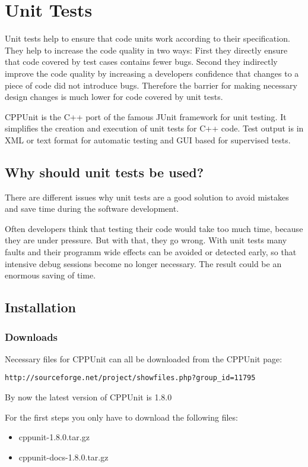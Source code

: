 \chapter{Unit Tests}

Unit tests help to ensure that code units work according to their specification.
They help to increase the code quality in two ways: First they directly
ensure that code covered by test cases contains fewer bugs. Second they indirectly
improve the code quality by increasing a developers confidence that changes
to a piece of code did not introduce bugs. Therefore the barrier for making
necessary design changes is much lower for code covered by unit tests.

CPPUnit is the C++ port of the famous JUnit framework for unit
testing. It simplifies the creation and execution of unit tests
for C++ code. Test output is in XML or text format for automatic
testing and GUI based for supervised tests.

\section{Why should unit tests be used?}

There are different issues why unit tests are a good solution to
avoid mistakes and save time during the software development.

Often developers think that testing their code would take too much
time, because they are under pressure. But with that, they go
wrong. With unit tests many faults and their programm wide effects
can be avoided or detected early, so that intensive debug sessions
become no longer necessary. The result could be an enormous saving
of time.


\section{Installation}

\subsection{Downloads}
Necessary files for CPPUnit can all be downloaded from the CPPUnit page:
\begin{verbatim}
http://sourceforge.net/project/showfiles.php?group_id=11795
\end{verbatim}

By now the latest version of CPPUnit is 1.8.0

For the first steps you only have to download the following files:
\begin{itemize}
\item cppunit-1.8.0.tar.gz
\item cppunit-docs-1.8.0.tar.gz
\end{itemize}

